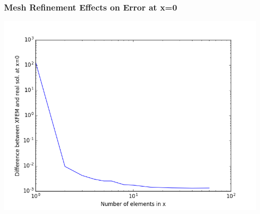 \documentclass[]{beamer}
\begin{document}
\begin{frame}[t]\frametitle{Mesh Refinement Effects on Error at x=0}
	\begin{center}
		\includegraphics[scale=0.4]{figures/1D_xy_ls1mat_neumann_comp}
	\end{center}
\end{frame}
\end{document}
